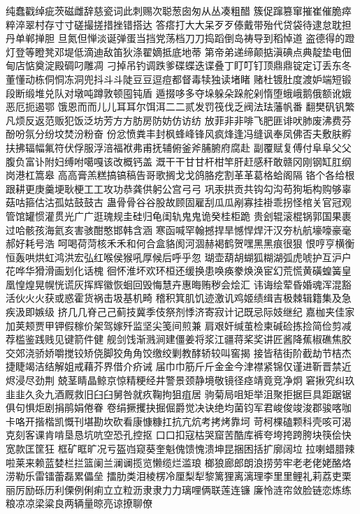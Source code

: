 纯蠢戳绰疵茨磁雌辞慈瓷词此刺赐次聪葱囱匆从丛凑粗醋
簇促蹿篡窜摧崔催脆瘁粹淬翠村存⼨寸磋撮搓措挫错搭达
答瘩打⼤大呆⽍歹傣戴带殆代贷袋待逮怠耽担丹单郸掸胆
旦氮但惮淡诞弹蛋当挡党荡档⼑刀捣蹈倒岛祷导到稻悼道
盗德得的蹬灯登等瞪凳邓堤低滴迪敌笛狄涤翟嫡抵底地蒂
第帝弟递缔颠掂滇碘点典靛垫电佃甸店惦奠淀殿碉叼雕凋
刁掉吊钓调跌爹碟蝶迭谍叠丁盯叮钉顶⿍鼎锭定订丢东冬
董懂动栋侗恫冻洞兜抖⽃斗陡⾖豆逗痘都督毒犊独读堵睹
赌杜镀肚度渡妒端短锻段断缎堆兑队对墩吨蹲敦顿囤钝盾
遁掇哆多夺垛躲朵跺舵剁惰堕蛾峨鹅俄额讹娥恶厄扼遏鄂
饿恩⽽而⼉儿⽿耳尔饵洱⼆二贰发罚筏伐乏阀法珐藩帆番
翻樊矾钒繁凡烦反返范贩犯饭泛坊芳⽅方肪房防妨仿访纺
放菲⾮非啡飞肥匪诽吠肺废沸费芬酚吩氛分纷坟焚汾粉奋
份忿愤粪丰封枫蜂峰锋风疯烽逢冯缝讽奉凤佛否夫敷肤孵
扶拂辐幅氟符伏俘服浮涪福袱弗甫抚辅俯釜斧脯腑府腐赴
副覆赋复傅付⾩阜⽗父腹负富讣附妇缚咐噶嘎该改概钙盖
溉⼲干⽢甘杆柑竿肝赶感秆敢赣冈刚钢缸肛纲岗港杠篙皋
⾼高膏羔糕搞镐稿告哥歌搁⼽戈鸽胳疙割⾰革葛格蛤阁隔
铬个各给根跟耕更庚羹埂耿梗⼯工攻功恭龚供躬公宫⼸弓
巩汞拱贡共钩勾沟苟狗垢构购够辜菇咕箍估沽孤姑⿎鼓古
蛊⾻骨⾕谷股故顾固雇刮⽠瓜剐寡挂褂乖拐怪棺关官冠观
管馆罐惯灌贯光⼴广逛瑰规圭硅归龟闺轨⿁鬼诡癸桂柜跪
贵刽辊滚棍锅郭国果裹过哈骸孩海氦亥害骇酣憨邯韩含涵
寒函喊罕翰撼捍旱憾悍焊汗汉夯杭航壕嚎豪毫郝好耗号浩
呵喝荷菏核⽲禾和何合盒貉阂河涸赫褐鹤贺嘿⿊黑痕很狠
恨哼亨横衡恒轰哄烘虹鸿洪宏弘红喉侯猴吼厚候后呼乎忽
瑚壶葫胡蝴狐糊湖弧虎唬护互沪户花哗华猾滑画划化话槐
徊怀淮坏欢环桓还缓换患唤痪豢焕涣宦幻荒慌黄磺蝗簧皇
凰惶煌晃幌恍谎灰挥辉徽恢蛔回毁悔慧卉惠晦贿秽会烩汇
讳诲绘荤昏婚魂浑混豁活伙⽕火获或惑霍货祸击圾基机畸
稽积箕肌饥迹激讥鸡姬绩缉吉极棘辑籍集及急疾汲即嫉级
挤⼏几脊⼰己蓟技冀季伎祭剂悸济寄寂计记既忌际妓继纪
嘉枷夹佳家加荚颊贾甲钾假稼价架驾嫁歼监坚尖笺间煎兼
肩艰奸缄茧检柬碱硷拣捡简俭剪减荐槛鉴践贱见键箭件健
舰剑饯渐溅涧建僵姜将浆江疆蒋桨奖讲匠酱降蕉椒礁焦胶
交郊浇骄娇嚼搅铰矫侥脚狡⾓角饺缴绞剿教酵轿较叫窖揭
接皆秸街阶截劫节桔杰捷睫竭洁结解姐戒藉芥界借介疥诫
届⼱巾筋⽄斤⾦金今津襟紧锦仅谨进靳晋禁近烬浸尽劲荆
兢茎睛晶鲸京惊精粳经井警景颈静境敬镜径痉靖竟竞净炯
窘揪究纠玖⾲韭久灸九酒厩救旧⾅臼舅咎就疚鞠拘狙疽居
驹菊局咀矩举沮聚拒据巨具距踞锯俱句惧炬剧捐鹃娟倦眷
卷绢撅攫抉掘倔爵觉决诀绝均菌钧军君峻俊竣浚郡骏喀咖
卡咯开揩楷凯慨刊堪勘坎砍看康慷糠扛抗亢炕考拷烤靠坷
苛柯棵磕颗科壳咳可渴克刻客课肯啃垦恳坑吭空恐孔控抠
⼝口扣寇枯哭窟苦酷库裤夸垮挎跨胯块筷侩快宽款匡筐狂
框矿眶旷况亏盔岿窥葵奎魁傀馈愧溃坤昆捆困括扩廓阔垃
拉喇蜡腊辣啦莱来赖蓝婪栏拦篮阑兰澜谰揽览懒缆烂滥琅
榔狼廊郎朗浪捞劳牢⽼老佬姥酪烙涝勒乐雷镭蕾磊累儡垒
擂肋类泪棱楞冷厘梨犁黎篱狸离漓理李⾥里鲤礼莉荔吏栗
丽厉励砾历利傈例俐痢⽴立粒沥⾪隶⼒力璃哩俩联莲连镰
廉怜涟帘敛脸链恋炼练粮凉凉梁粱良两辆量晾亮谅撩聊僚
